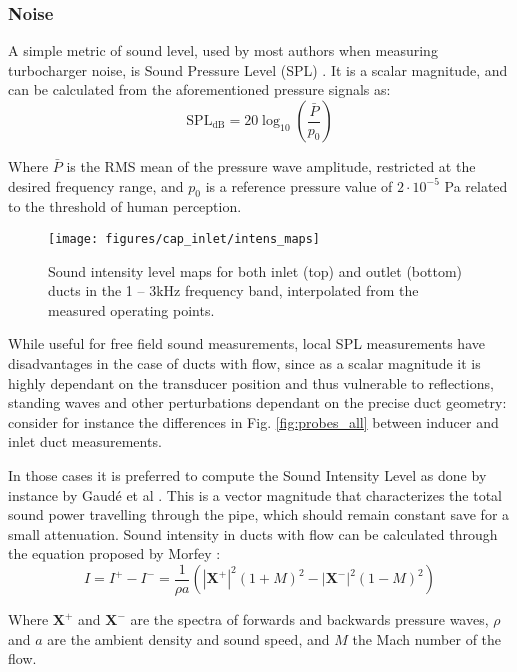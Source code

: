 \subsubsection{Noise}

A simple metric of sound level, used by most authors when measuring turbocharger noise, is Sound Pressure Level (SPL) \cite{evans2006reduction,trochon2001new,lee2011control}. It is a scalar magnitude, and can be calculated from the aforementioned pressure signals as:
\begin{equation}
  \text{SPL}_\text{dB} = 20\log_{10}\left(\frac{\bar P}{p_0}\right)
\end{equation}

Where $\bar P$ is the RMS mean of the pressure wave amplitude, restricted at the desired frequency range, and $p_0$ is a reference pressure value of $2\cdot 10^{-5}$ Pa related to the threshold of human perception.

\begin{figure}[htb!]
\centering
\texttt{[image: figures/cap\_inlet/intens\_maps]}
\caption{Sound intensity level maps for both inlet (top) and outlet (bottom) ducts in the 1 -- 3kHz frequency band, interpolated from the measured operating points.}
\label{fig:intens_maps}
\end{figure}

While useful for free field sound measurements, local SPL measurements have disadvantages in the case of ducts with flow, since as a scalar magnitude it is highly dependant on the transducer position and thus vulnerable to reflections, standing waves and other perturbations dependant on the precise duct geometry: consider for instance the differences in Fig. \ref{fig:probes_all} between inducer and inlet duct measurements.

In those cases it is preferred to compute the Sound Intensity Level as done by instance by Gaudé et al \cite{gaude2008experimental}. This is a vector magnitude that characterizes the total sound power travelling through the pipe, which should remain constant save for a small attenuation. Sound intensity in ducts with flow can be calculated through the equation proposed by Morfey \cite{morfey1971sound,dokumaci2000calculation,holland2000measurement}:
\begin{equation}\label{eq:intensity}
    I=I^+-I^-=\frac{1}{\rho a}\left(|\mathbf X^+ |^2(1+M)^2-|\mathbf X^- |^2(1-M)^2\right)
\end{equation}

Where $\mathbf X^+$ and $\mathbf X^-$ are the spectra of forwards and backwards pressure waves, $\rho$ and $a$ are the ambient density and sound speed, and $M$ the Mach number of the flow. 

